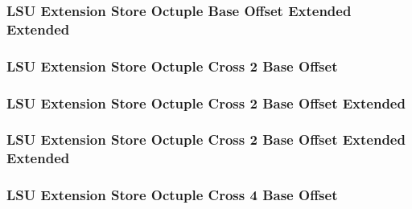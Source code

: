 \subsubsection[{\small LSU Extension Store Octuple Base Offset Extended Extended}]{LSU Extension Store Octuple Base Offset Extended Extended} \label{sec:format-LSU-XSOBO.Y}



\subsubsection[{\small LSU Extension Store Octuple Cross 2 Base Offset}]{LSU Extension Store Octuple Cross 2 Base Offset} \label{sec:format-LSU-XSOC2BO}



\subsubsection[{\small LSU Extension Store Octuple Cross 2 Base Offset Extended}]{LSU Extension Store Octuple Cross 2 Base Offset Extended} \label{sec:format-LSU-XSOC2BO.X}



\subsubsection[{\small LSU Extension Store Octuple Cross 2 Base Offset Extended Extended}]{LSU Extension Store Octuple Cross 2 Base Offset Extended Extended} \label{sec:format-LSU-XSOC2BO.Y}



\subsubsection[{\small LSU Extension Store Octuple Cross 4 Base Offset}]{LSU Extension Store Octuple Cross 4 Base Offset} \label{sec:format-LSU-XSOC4BO}



